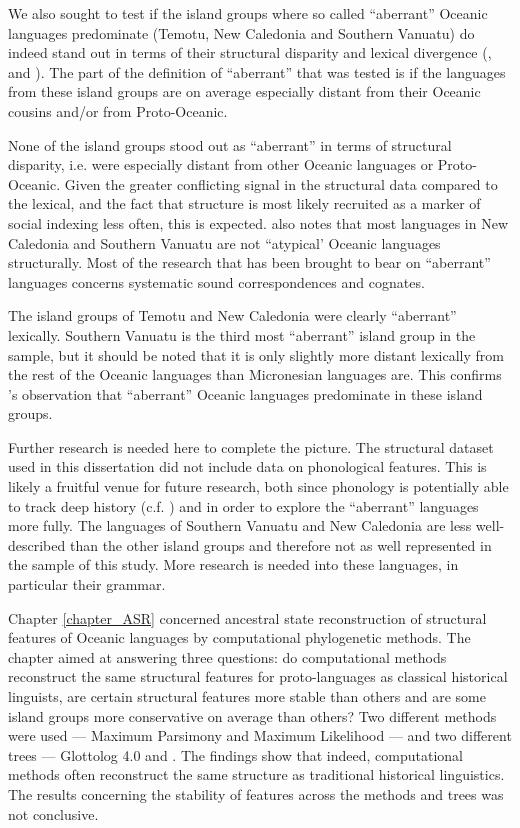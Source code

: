 \documentclass[draft,10pt]{article} %
\begin{document}
We also sought to test if the island groups where so called ``aberrant'' Oceanic languages predominate (Temotu, New Caledonia and Southern Vanuatu) do indeed stand out in terms of their structural disparity and lexical divergence (\citet{grace1981indirect}, \citet{grace_1992_aberrant} and \citet{pawley2006explaining}). The part of the definition of ``aberrant'' that was tested is if the languages from these island groups are on average especially distant from their Oceanic cousins and/or from Proto-Oceanic. 

None of the island groups stood out as ``aberrant'' in terms of structural disparity, i.e. were especially distant from other Oceanic languages or Proto-Oceanic. Given the greater conflicting signal in the structural data compared to the lexical, and the fact that structure is most likely recruited as a marker of social indexing less often, this is expected. \citet[219]{pawley2006explaining} also notes that most languages in New Caledonia and Southern Vanuatu are not ``atypical' Oceanic languages structurally. Most of the research that has been brought to bear on ``aberrant'' languages concerns systematic sound correspondences and cognates.

The island groups of Temotu and New Caledonia were clearly ``aberrant'' lexically. Southern Vanuatu is the third most ``aberrant'' island group in the sample, but it should be noted that it is only slightly more distant lexically from the rest of the Oceanic languages than Micronesian languages are. This confirms \citet{pawley2006explaining}'s observation that ``aberrant'' Oceanic languages predominate in these island groups.

Further research is needed here to complete the picture. The structural dataset used in this dissertation did not include data on phonological features. This is likely a fruitful venue for future research, both since phonology is potentially able to track deep history (c.f. \cite{evansaustralia_2019}) and in order to explore the ``aberrant'' languages more fully. The languages of Southern Vanuatu and New Caledonia are less well-described than the other island groups and therefore not as well represented in the sample of this study. More research is needed into these languages, in particular their grammar.

Chapter \ref{chapter_ASR} concerned ancestral state reconstruction of structural features of Oceanic languages by computational phylogenetic methods. The chapter aimed at answering three questions: do computational methods reconstruct the same structural features for proto-languages as classical historical linguists, are certain structural features more stable than others and are some island groups more conservative on average than others? Two different methods were used --- Maximum Parsimony and Maximum Likelihood --- and two different trees --- Glottolog 4.0 \citep{glottolog40} and \citet{grayetal_2009}. The findings show that indeed, computational methods often reconstruct the same structure as traditional historical linguistics. The results concerning the stability of features across the methods and trees was not conclusive. 
\end{document}
